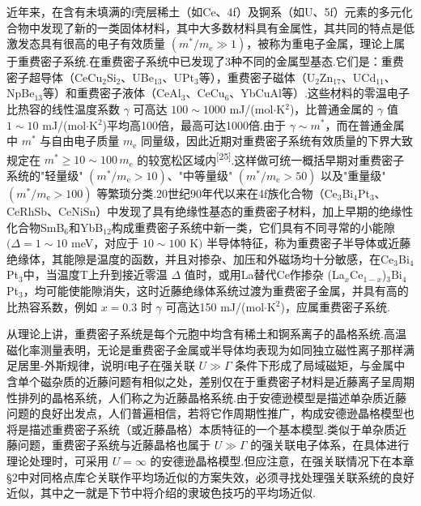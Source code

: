 近年来，在含有未填满的f壳层稀土（如Ce、4f）及锕系（如U、5f）元素的多元化合物中发现了新的一类固体材料，其中大多数材料具有金属性，其共同的特点是低激发态具有很高的电子有效质量 $(m^{*}/m_{\mathrm{e}}\gg1)$，被称为重电子金属，理论上属于重费密子系统.在重费密子系统中已发现了3种不同的金属型基态.它们是：重费密子超导体（CeCu$_{2}$Si$_{2}$、UBe$_{13}$、UPt$_{3}$等），重费密子磁体（U$_{2}$Zn$_{17}$、UCd$_{11}$、NpBe$_{13}$等）和重费密子液体（CeAl$_{3}$、CeCu$_{6}$、YbCuAl等）.这些材料的零温电子比热容的线性温度系数 $\gamma$ 可高达 $100\sim1000$ mJ/(mol$\cdot$K$^{2}$)，比普通金属的 $\gamma$ 值 $1\sim10$ mJ/(mol$\cdot$K$^{2}$)平均高100倍，最高可达1000倍.由于 $\gamma\sim m^{*}$，而在普通金属中 $m^{*}$ 与自由电子质量 $m_{\mathrm{e}}$ 同量级，因此近期对重费密子系统有效质量的下界大致规定在 $m^{*}\geqslant10\sim100\,m_{\mathrm{e}}$ 的较宽松区域内\textsuperscript{[25]}.这样做可统一概括早期对重费密子系统的"轻量级" $(m^{*}/m_{\mathrm{e}}>10)$、"中等量级" $(m^{*}/m_{\mathrm{e}}>50)$ 以及"重量级" $(m^{*}/m_{\mathrm{e}}>100)$ 等繁琐分类.20世纪90年代以来在4f族化合物（Ce$_{3}$Bi$_{4}$Pt$_{3}$、CeRhSb、CeNiSn）中发现了具有绝缘性基态的重费密子材料，加上早期的绝缘性化合物SmB$_{6}$和YbB$_{12}$构成重费密子系统中新一类，它们具有不同寻常的小能隙 $(\Delta=1\sim10$ meV，对应于 $10\sim100$ K$)$ 半导体特征，称为重费密子半导体或近藤绝缘体，其能隙是温度的函数，并且对掺杂、加压和外磁场均十分敏感，在Ce$_{3}$Bi$_{4}$Pt$_{3}$中，当温度T上升到接近零温 $\Delta$ 值时，或用La替代Ce作掺杂 (La$_{x}$Ce$_{1-x}$)$_{3}$Bi$_{4}$Pt$_{3}$，均可能使能隙消失，这时近藤绝缘体系统过渡为重费密子金属，并具有高的比热容系数，例如 $x=0.3$ 时 $\gamma$ 可高达150 mJ/(mol$\cdot$K$^{2}$)，应属重费密子系统.

从理论上讲，重费密子系统是每个元胞中均含有稀土和锕系离子的晶格系统.高温磁化率测量表明，无论是重费密子金属或半导体均表现为如同独立磁性离子那样满足居里-外斯规律，说明f电子在强关联 $U\gg\Gamma$ 条件下形成了局域磁矩，与金属中含单个磁杂质的近藤问题有相似之处，差别仅在于重费密子材料是近藤离子呈周期性排列的晶格系统，人们称之为近藤晶格系统.由于安德逊模型是描述单杂质近藤问题的良好出发点，人们普遍相信，若将它作周期性推广，构成安德逊晶格模型也将是描述重费密子系统（或近藤晶格）本质特征的一个基本模型.类似于单杂质近藤问题，重费密子系统与近藤晶格也属于 $U\gg\Gamma$ 的强关联电子体系，在具体进行理论处理时，可采用 $U=\infty$ 的安德逊晶格模型.但应注意，在强关联情况下在本章§2中对同格点库仑关联作平均场近似的方案失效，必须寻找处理强关联系统的良好近似，其中之一就是下节中将介绍的隶玻色技巧的平均场近似.

